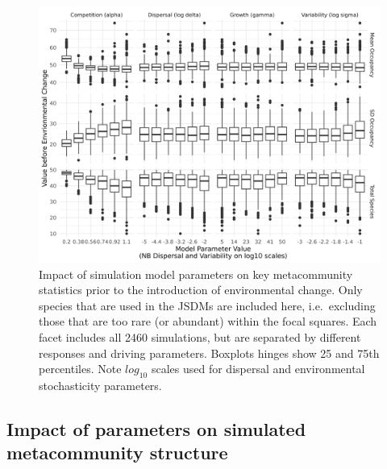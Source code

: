 \documentclass[
]{article}
\begin{document}
\begin{figure}
\centering
\includegraphics{SimulationMarkdowns/Figures/OccuBefore.png}
\caption{Impact of simulation model parameters on key metacommunity
statistics prior to the introduction of environmental change. Only
species that are used in the JSDMs are included here, i.e.~excluding
those that are too rare (or abundant) within the focal squares. Each
facet includes all 2460 simulations, but are separated by different
responses and driving parameters. Boxplots hinges show 25 and 75th
percentiles. Note \(log_{10}\) scales used for dispersal and
environmental stochasticity parameters.}
\end{figure}

\hypertarget{impact-of-parameters-on-simulated-metacommunity-structure}{%
\subsection{Impact of parameters on simulated metacommunity
structure}\label{impact-of-parameters-on-simulated-metacommunity-structure}}
\end{document}
